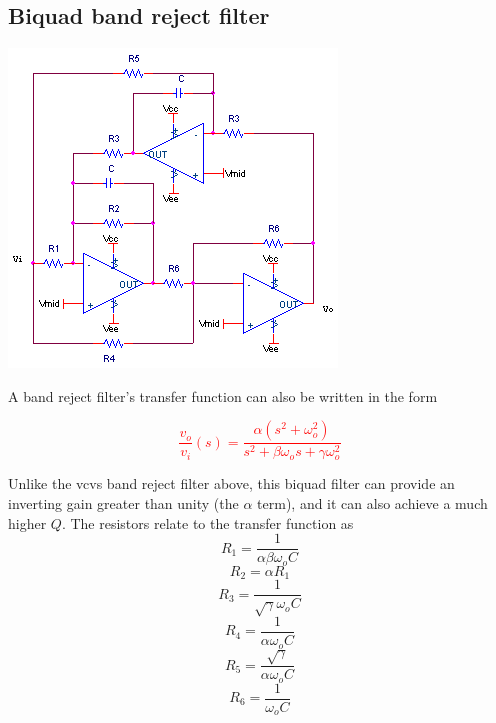 \subsection{Biquad band reject filter}
\begin{center}
	\includegraphics{schematics/biquad_bandreject.PNG}
\end{center}
A band reject filter's transfer function can also be written in the form 

\textcolor{red}{
\begin{equation}
\frac{v_{o}}{v_{i}}(s) = \frac{\alpha (s^{2} + \omega_{o}^{2})}{s^{2} + \beta \omega_{o}s + \gamma \omega_{o}^{2}}
\label{eq:biquad_bandreject}
\end{equation}
}

Unlike the \ac{vcvs} band reject filter above, this biquad filter can provide an inverting gain greater than unity (the $\alpha$ term), and it can also achieve a much higher $Q$.
The resistors relate to the transfer function as \autocite[146-148]{op-amp-circuits-johnson}
\begin{equation}
R_1 = \frac{1}{\alpha \beta \omega_{o}C}
\end{equation}
\begin{equation}
R_2 = \alpha R_1
\end{equation}
\begin{equation}
R_3 = \frac{1}{\sqrt{\gamma} \omega_{o}C}
\end{equation}
\begin{equation}
R_4 = \frac{1}{\alpha \omega_{o}C}
\end{equation}
\begin{equation}
R_5 = \frac{\sqrt{\gamma}}{\alpha \omega_{o}C}
\end{equation}
\begin{equation}
R_6 = \frac{1}{\omega_{o}C}
\end{equation}

